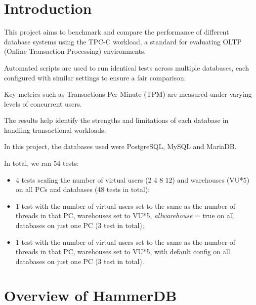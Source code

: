 \section{Introduction}
\label{sec:intro}

This project aims to benchmark and compare the performance of different database systems using the TPC-C workload, a standard for evaluating OLTP (Online Transaction Processing) environments.

Automated scripts are used to run identical tests across multiple databases, each configured with similar settings to ensure a fair comparison.

Key metrics such as Transactions Per Minute (TPM) are measured under varying levels of concurrent users.

The results help identify the strengths and limitations of each database in handling transactional workloads.

In this project, the databases used were PostgreSQL, MySQL and MariaDB.

In total, we ran 54 tests:

\begin{itemize}
    \setlength\itemsep{0.1em}
    \item 4 tests scaling the number of virtual users (2 4 8 12) and warehouses (VU*5) on all PCs and databases (48 tests in total);
    \item 1 test with the number of virtual users set to the same as the number of threads in that PC, warehouses set to VU*5, \emph{allwarehouse} = true on all databases on just one PC (3 test in total);
    \item 1 test with the number of virtual users set to the same as the number of threads in that PC, warehouses set to VU*5, with default config on all databases on just one PC (3 test in total).
\end{itemize}

\section{Overview of HammerDB}
\label{sec:hammerdb}

